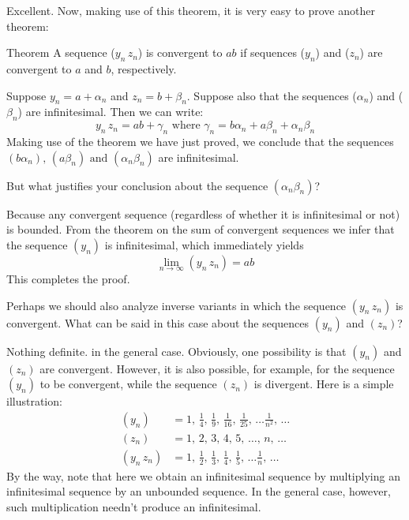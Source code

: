 {\athr Excellent. Now, making use of this theorem, it is very easy to prove another theorem: 
\begin{mytheo}{Theorem}
A sequence ($y_{n}\, z_{n}$) is convergent to $ab$ if sequences ($y_{n}$) and
($z_{n}$) are convergent to $a$ and $b$, respectively.
\end{mytheo}
Suppose $y_{n} = a + \alpha_{n}$ and $z_{n} = b + \beta_{n}$. Suppose also
that the sequences ($\alpha_{n}$) and ($\beta_{n}$) are infinitesimal. Then we
can write:
\begin{equation*}%
y_{n}\, z_{n} = ab + \gamma_{n} \,\, \text{where} \,\, \gamma_{n} = b \alpha_{n} + a \beta_{n} + \alpha_{n} \beta_{n}
\end{equation*}
Making use of the theorem we have just proved, we conclude that the sequences $(b \alpha_{n}), \, (a \beta_{n}) \,\, \text{and} \,\, (\alpha_{n} \beta_{n}) $ are infinitesimal.

\rdr But what justifies your conclusion about the sequence $(\alpha_{n} \beta_{n}) $? 

\athr Because any convergent sequence (regardless of whether it is infinitesimal or not) is bounded. From the theorem on the sum of convergent sequences we infer that the sequence $(y_{n})$ is infinitesimal, which immediately yields
\begin{equation*}%
\lim\limits_{n \to \infty} (y_{n} \,z_{n}) = ab
\end{equation*}
This completes the proof. 

\rdr Perhaps we should also analyze inverse variants in which the sequence $ (y_{n} \,z_{n})$ is convergent. What can be said in this case about the sequences $(y_{n})$ and $(z_{n})$?

\athr Nothing definite. in the general case. Obviously, one possibility is that $(y_{n})$ and $(z_{n})$ are convergent. However, it is also possible, for example, for the sequence $(y_{n})$ to be convergent, while the sequence $(z_{n})$ is divergent. Here is a simple illustration:
\begin{align*}%
(y_{n}) & = 1, \, \frac{1}{4}, \, \frac{1}{9}, \, \frac{1}{16}, \, \frac{1}{25}, \, \ldots \frac{1}{n^{2}}, \, \ldots \\
(z_{n}) & =  1, \, 2, \, 3, \, 4, \, 5, \, \ldots, \, n, \, \ldots \\
(y_{n} \, z_{n}) & =   1, \, \frac{1}{2}, \, \frac{1}{3}, \, \frac{1}{4}, \, \frac{1}{5}, \, \ldots \frac{1}{n}, \, \ldots
\end{align*}
By the way, note that here we obtain an infinitesimal sequence by multiplying an infinitesimal sequence by an unbounded sequence. In the general case, however, such multiplication needn't produce an infinitesimal.

}
